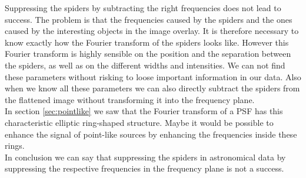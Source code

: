 Suppressing the spiders by subtracting the right frequencies does not lead to success. The problem is that the frequencies caused by the spiders and the ones caused by the interesting objects in the image overlay. It is therefore necessary to know exactly how the Fourier transform of the spiders looks like. However this Fourier transform is highly sensible on the position and the separation between the spiders, as well as on the different widths and intensities. We can not find these parameters without risking to loose important information in our data. Also when we know all these parameters we can also directly subtract the spiders from the flattened image without transforming it into the frequency plane.\\ 
In section \ref{sec:pointlike} we saw that the Fourier transform of a PSF has this characteristic elliptic ring-shaped structure. Maybe it would be possible to enhance the signal of point-like sources by enhancing the frequencies inside these rings. \\
In conclusion we can say that suppressing the spiders in astronomical data by suppressing the respective frequencies in the frequency plane is not a success. 
 